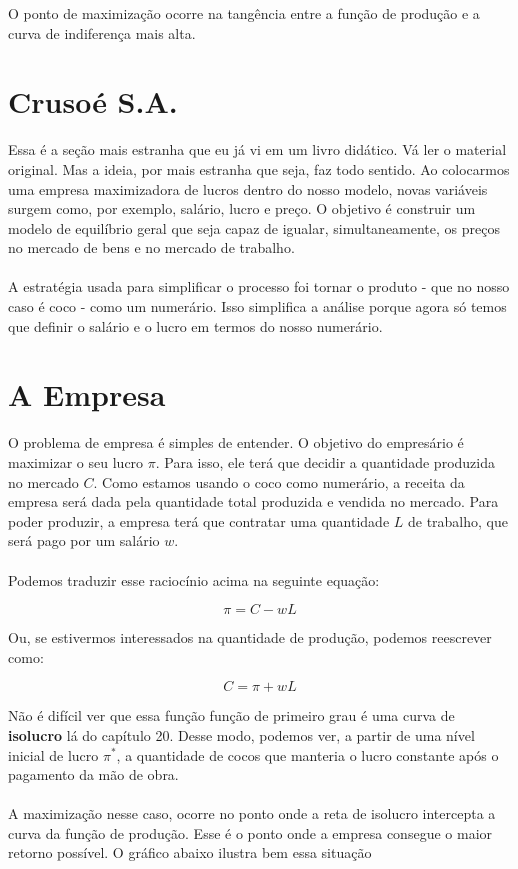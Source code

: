 \documentclass[a4paper,11pt,oneside]{book}
\theoremstyle{definition}
\theoremstyle{break}
\begin{document}
O ponto de maximização ocorre na tangência entre a função de produção e a curva de indiferença mais alta.

\section{Crusoé S.A.}

Essa é a seção mais estranha que eu já vi em um livro didático. Vá ler o material original. Mas a ideia, por mais estranha que seja, faz todo sentido. Ao colocarmos uma empresa maximizadora de lucros dentro do nosso modelo, novas variáveis surgem como, por exemplo, salário, lucro e preço. O objetivo é construir um modelo de equilíbrio geral que seja capaz de igualar, simultaneamente, os preços no mercado de bens e no mercado de trabalho.
\\
\\
A estratégia usada para simplificar o processo foi tornar o produto - que no nosso caso é coco - como um numerário. Isso simplifica a análise porque agora só temos que definir o salário e o lucro em termos do nosso numerário.

\section{A Empresa}

O problema de empresa é simples de entender. O objetivo do empresário é maximizar o seu lucro $\pi$. Para isso, ele terá que decidir a quantidade produzida no mercado $C$. Como estamos usando o coco como numerário, a receita da empresa será dada pela quantidade total produzida e vendida no mercado. Para poder produzir, a empresa terá que contratar uma quantidade $L$ de trabalho, que será pago por um salário $w$.
\\
\\
Podemos traduzir esse raciocínio acima na seguinte equação:

$$ \pi = C - wL $$

Ou, se estivermos interessados na quantidade de produção, podemos reescrever como:

$$ C = \pi + wL $$

Não é difícil ver que essa função função de primeiro grau é uma curva de \textbf{isolucro} lá do capítulo 20. Desse modo, podemos ver, a partir de uma nível inicial de lucro $\pi^*$, a quantidade de cocos que manteria o lucro constante após o pagamento da mão de obra.
\\
\\
A maximização nesse caso, ocorre no ponto onde a reta de isolucro intercepta a curva da função de produção. Esse é o ponto onde a empresa consegue o maior retorno possível. O gráfico abaixo ilustra bem essa situação
\end{document}
